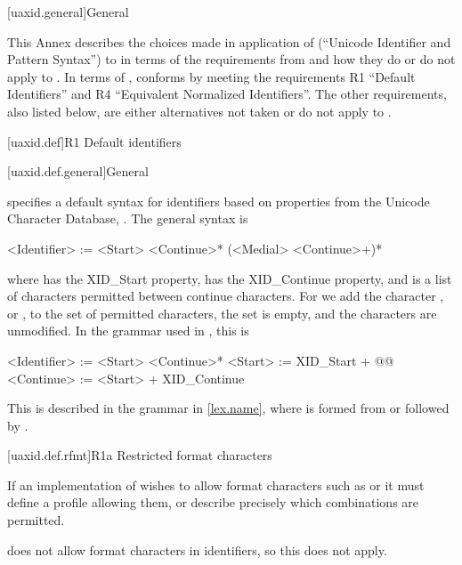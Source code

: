
[uaxid.general]{General}

\pnum
This Annex describes the choices made in application of
 (``Unicode Identifier and Pattern Syntax'')
to \Cpp{} in terms of the requirements from  and
how they do or do not apply to \Cpp{}.
In terms of ,
\Cpp{} conforms by meeting the requirements
R1 ``Default Identifiers'' and
R4 ``Equivalent Normalized Identifiers''.
The other requirements, also listed below,
are either alternatives not taken or do not apply to \Cpp{}.

[uaxid.def]{R1 Default identifiers}

[uaxid.def.general]{General}

\pnum
{} specifies a default syntax for identifiers
based on properties from the Unicode Character Database, .
The general syntax is
\begin{codeblock}
<Identifier> := <Start> <Continue>* (<Medial> <Continue>+)*
\end{codeblock}
where  has the XID_Start property,
 has the XID_Continue property, and
 is a list of characters permitted between continue characters.
For \Cpp{} we add the character , or \tcode{_},
to the set of permitted  characters,
the  set is empty, and
the  characters are unmodified.
In the grammar used in , this is
\begin{codeblock}
<Identifier> := <Start> <Continue>*
<Start> := XID_Start + @\textrm{}@
<Continue> := <Start> + XID_Continue
\end{codeblock}

\pnum
This is described in the \Cpp{} grammar in \ref{lex.name},
where  is formed from
 or
 followed by .

[uaxid.def.rfmt]{R1a Restricted format characters}

\pnum
If an implementation of  wishes to allow format characters
such as  or 
it must define a profile allowing them, or
describe precisely which combinations are permitted.

\pnum
\Cpp{} does not allow format characters in identifiers, so this does not apply.

